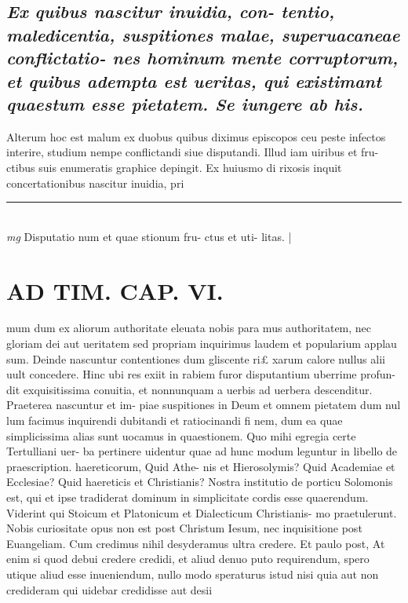 \documentclass{article}
\begin{document}
\begin{pages}
\subsection*{\textit{Ex quibus nascitur inuidia, con- tentio, maledicentia, suspitiones malae, superuacaneae conflictatio- nes hominum mente corruptorum, et quibus adempta est ueritas, qui existimant quaestum esse pietatem. Se iungere ab his. }}\pstart Alterum hoc est malum ex duobus quibus diximus episcopos ceu peste infectos interire, studium nempe conflictandi siue disputandi. Illud iam uiribus et fru- ctibus suis enumeratis graphice depingit. Ex huiusmo di rixosis inquit concertationibus nascitur inuidia, pri  \pend
\vspace{0.5cm}\noindent
\vspace{0.2cm}\rule{1cm}{0.2pt}\\ 
\hspace{0.2cm}\textit{mg}
\footnotesize Disputatio num et quae stionum fru- ctus et uti- litas. 
\normalsize| 
\section*{AD TIM. CAP. VI. }
\marginpar{[ p.166 ]}\pstart mum dum ex aliorum authoritate eleuata nobis para mus authoritatem, nec gloriam dei aut ueritatem sed propriam inquirimus laudem et popularium applau sum. Deinde nascuntur contentiones dum gliscente ri£ xarum calore nullus alii uult concedere. Hinc ubi res exiit in rabiem furor disputantium uberrime profun- dit exquisitissima conuitia, et nonnunquam a uerbis ad uerbera descenditur. Praeterea nascuntur et im- piae suspitiones in Deum et omnem pietatem dum nul lum facimus inquirendi dubitandi et ratiocinandi fi nem, dum ea quae simplicissima alias sunt uocamus in quaestionem. Quo mihi egregia certe Tertulliani uer- ba pertinere uidentur quae ad hunc modum leguntur in libello de praescription. haereticorum, Quid Athe- nis et Hierosolymis? Quid Academiae et Ecclesiae? Quid haereticis et Christianis? Nostra institutio de porticu Solomonis est, qui et ipse tradiderat dominum in simplicitate cordis esse quaerendum. Viderint qui Stoicum et Platonicum et Dialecticum Christianis- mo praetulerunt. Nobis curiositate opus non est post Christum Iesum, nec inquisitione post Euangeliam. Cum credimus nihil desyderamus ultra credere. Et paulo post, At enim si quod debui credere credidi, et aliud denuo puto requirendum, spero utique aliud esse inueniendum, nullo modo speraturus istud nisi quia aut non credideram qui uidebar credidisse aut desii  \pend

\end{pages}
\end{document}

